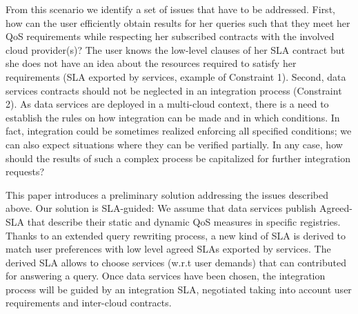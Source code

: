

  From this scenario we identify a set of issues that have to be addressed. First, how can the user efficiently obtain  results for her queries such that they meet her QoS requirements while respecting her subscribed contracts with the involved cloud provider(s)?  The user knows the low-level clauses of her SLA contract but she does not have an idea about the resources required to satisfy her requirements (SLA exported by services, example of Constraint 1).  Second, data services contracts should not be neglected in an integration process (Constraint 2).   As data services are deployed in a multi-cloud context, there is a need to establish the rules on how integration can be made and in which conditions. In fact, integration could be sometimes realized enforcing all specified conditions; we can also expect situations where they can be verified partially. In any case, how should the results of  such a  complex process  be capitalized for further integration requests?
  
This paper introduces a preliminary solution addressing the issues described above.  Our solution is SLA-guided: We assume that data services publish Agreed-SLA that describe their  static and dynamic QoS measures in specific registries.  Thanks to an extended query rewriting process, a new kind of SLA is derived to match user preferences with low level agreed SLAs exported by services. The derived SLA allows to choose  services (w.r.t user demands) that can contributed for answering a query. Once data services have been chosen, the integration process will be guided by an integration SLA, negotiated taking into account user requirements and inter-cloud contracts.

